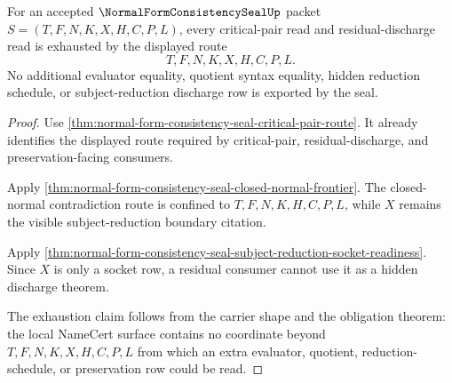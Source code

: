 \begin{theorem}
\label{thm:normal-form-consistency-seal-critical-pair-frontier-exhaustion}
For an accepted $\NormalFormConsistencySealUp$ packet
$S=(T,F,N,K,X,H,C,P,L)$, every critical-pair read and residual-discharge read is
exhausted by the displayed route
$$
T,F,N,K,X,H,C,P,L .
$$
No additional evaluator equality, quotient syntax equality, hidden reduction
schedule, or subject-reduction discharge row is exported by the seal.
\end{theorem}
\begin{proof}
Use \autoref{thm:normal-form-consistency-seal-critical-pair-route}. It already
identifies the displayed route required by critical-pair, residual-discharge,
and preservation-facing consumers.

Apply \autoref{thm:normal-form-consistency-seal-closed-normal-frontier}. The
closed-normal contradiction route is confined to $T,F,N,K,H,C,P,L$, while $X$
remains the visible subject-reduction boundary citation.

Apply \autoref{thm:normal-form-consistency-seal-subject-reduction-socket-readiness}.
Since $X$ is only a socket row, a residual consumer cannot use it as a hidden
discharge theorem.

The exhaustion claim follows from the carrier shape and the obligation theorem:
the local NameCert surface contains no coordinate beyond $T,F,N,K,X,H,C,P,L$
from which an extra evaluator, quotient, reduction-schedule, or preservation
row could be read.
\end{proof}

